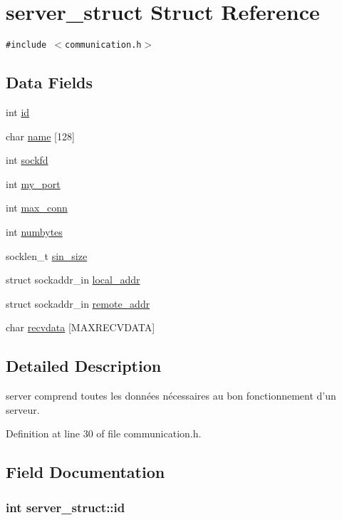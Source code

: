 \hypertarget{structserver__struct}{
\section{server\_\-struct Struct Reference}
\label{structserver__struct}
}
{\tt \#include $<$communication.h$>$}

\subsection*{Data Fields}
\begin{CompactItemize}
\item 
int \hyperlink{structserver__struct_36f42199a23f5b79ebd56be10f6a898b}{id}
\item 
char \hyperlink{structserver__struct_a50388c012354da44c2f85cf0492b932}{name} \mbox{[}128\mbox{]}
\item 
int \hyperlink{structserver__struct_17659ebbdd1f18203ed0ead7ca1b5ed1}{sockfd}
\item 
int \hyperlink{structserver__struct_cfe32222ef17a379eb0d1979811e2ddb}{my\_\-port}
\item 
int \hyperlink{structserver__struct_8aa422f50ae575556a51e282277c79e7}{max\_\-conn}
\item 
int \hyperlink{structserver__struct_b56d302ce3497c35c81694b8f4d1e5d7}{numbytes}
\item 
socklen\_\-t \hyperlink{structserver__struct_a4ae791fe60087000b9badae65f6a813}{sin\_\-size}
\item 
struct sockaddr\_\-in \hyperlink{structserver__struct_7ab2ae9f72357160310633ae3e1ae14c}{local\_\-addr}
\item 
struct sockaddr\_\-in \hyperlink{structserver__struct_98c3d085937cf6ad2a5b600155088e79}{remote\_\-addr}
\item 
char \hyperlink{structserver__struct_a157cab1fdf76eee8fbe32dc7dd425d1}{recvdata} \mbox{[}MAXRECVDATA\mbox{]}
\end{CompactItemize}


\subsection{Detailed Description}
server comprend toutes les données nécessaires au bon fonctionnement d'un serveur. 

Definition at line 30 of file communication.h.

\subsection{Field Documentation}
\hypertarget{structserver__struct_36f42199a23f5b79ebd56be10f6a898b}{
\subsubsection{\setlength{\rightskip}{0pt plus 5cm}int {\bf server\_\-struct::id}}}
\label{structserver__struct_36f42199a23f5b79ebd56be10f6a898b}




